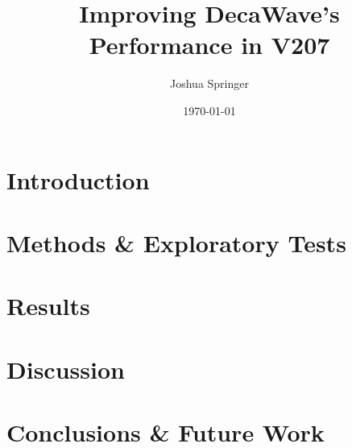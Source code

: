 \documentclass[conference]{IEEEtran}
\author{Joshua Springer}
\title{Improving DecaWave's Performance in V207}
\date{\today}
\begin{document}
	\maketitle

	\thispagestyle{plain}
	\pagestyle{plain}

	\section{Introduction}
	

	\section{Methods \& Exploratory Tests}
	

	\section{Results}
	
	
	\section{Discussion}
	
	
	\section{Conclusions \& Future Work}
	

%	
%	
\end{document}
